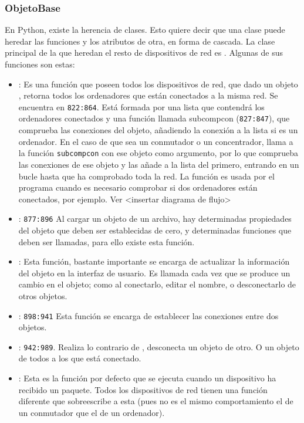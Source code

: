\documentclass[a4paper, 11pt]{report} %
\begin{document}
\newpage
\subsubsection{ObjetoBase}
En Python, existe la herencia de clases. Esto quiere decir que una clase puede heredar las funciones y los atributos de otra, en forma de cascada. La clase principal de la que heredan el resto de dispositivos de red es . Algunas de sus funciones son estas:

\begin{itemize}
\item {}: Es una función que poseen todos los dispositivos de red, que dado un objeto , retorna todos los ordenadores que están conectados a la misma red. Se encuentra en \texttt{822:864}. Está formada por una lista que contendrá los ordenadores conectados y una función llamada subcompcon (\texttt{827:847}), que comprueba las conexiones del objeto, añadiendo la conexión a la lista si es un ordenador. En el caso de que sea un conmutador o un concentrador, llama a la función \texttt{subcompcon} con ese objeto como argumento, por lo que comprueba las conexiones de ese objeto y las añade a la lista del primero, entrando en un bucle hasta que ha comprobado toda la red. La función es usada por el programa cuando es necesario comprobar si dos ordenadores están conectados, por ejemplo. Ver <insertar diagrama de flujo>
\item {}: \texttt{877:896} Al cargar un objeto de un archivo, hay determinadas propiedades del objeto que deben ser establecidas de cero, y determinadas funciones que deben ser llamadas, para ello existe esta función.
\item {}: Esta función, bastante importante se encarga de actualizar la información del objeto en la interfaz de usuario. Es llamada cada vez que se produce un cambio en el objeto; como al conectarlo, editar el nombre, o desconectarlo de otros objetos.
\item {}: \texttt{898:941} Esta función se encarga de establecer las conexiones entre dos objetos.
\item {}: \texttt{942:989}. Realiza lo contrario de , desconecta un objeto de otro. O un objeto de todos a los que está conectado.
\item {}: Esta es la función por defecto que se ejecuta cuando un dispositivo ha recibido un paquete. Todos los dispositivos de red tienen una función diferente que sobreescribe a esta (pues no es el mismo comportamiento el de un conmutador que el de un ordenador).
\end{itemize}
\end{document}
